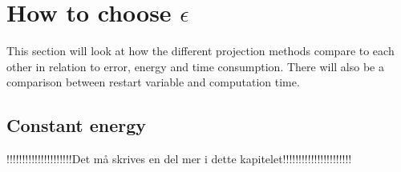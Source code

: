 \section{How to choose $\epsilon$} %
This section will look at how the different projection methods compare to each other in relation to error, energy and time consumption. There will also be a comparison between restart variable and computation time. 



\subsection{Constant energy} \label{sec:SLMconstant}%
!!!!!!!!!!!!!!!!!!!!!Det må skrives en del mer i dette kapitelet!!!!!!!!!!!!!!!!!!!!!!\\

